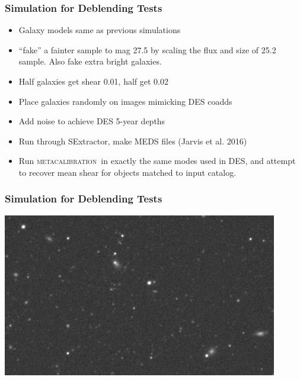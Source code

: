 \documentclass{beamer}
\newcommand{\mcal}{\textsc{metacalibration}}
\begin{document}
\frame
{

    \frametitle{Simulation for Deblending Tests}


    \begin{itemize}
        \item Galaxy models same as previous simulations
        \item ``fake'' a fainter sample to mag 27.5 by scaling
            the flux and size of 25.2 sample.  Also fake extra bright galaxies.
        \item Half galaxies get shear 0.01, half get 0.02
        \item Place galaxies randomly on images mimicking DES coadds
        \item Add noise to achieve DES 5-year depths
        \item Run through SExtractor, make MEDS files (Jarvis et al. 2016)
        \item Run \mcal\ in exactly the same modes used in DES, and
            attempt to recover mean shear for objects matched to 
            input catalog.

    \end{itemize}


}

\frame
{
    \frametitle{Simulation for Deblending Tests }
 
    \begin{center}
        \includegraphics[width=0.9\textwidth]{nbrsim-003f-009969-image-crop.jpg}
    \end{center}

}
\end{document}
